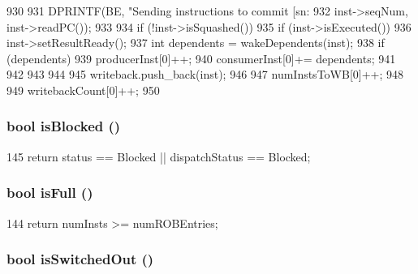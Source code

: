 \begin{DoxyCode}
930 {
931     DPRINTF(BE, "Sending instructions to commit [sn:%
932             inst->seqNum, inst->readPC());
933 
934     if (!inst->isSquashed()) {
935         if (inst->isExecuted()) {
936             inst->setResultReady();
937             int dependents = wakeDependents(inst);
938             if (dependents) {
939                 producerInst[0]++;
940                 consumerInst[0]+= dependents;
941             }
942         }
943     }
944 
945     writeback.push_back(inst);
946 
947     numInstsToWB[0]++;
948 
949     writebackCount[0]++;
950 }
\end{DoxyCode}
\hypertarget{classLWBackEnd_ae6ec007d68382eb124ed25bc90ae9c17}{
\subsubsection[{isBlocked}]{\setlength{\rightskip}{0pt plus 5cm}bool isBlocked ()}}
\label{classLWBackEnd_ae6ec007d68382eb124ed25bc90ae9c17}



\begin{DoxyCode}
145 { return status == Blocked || dispatchStatus == Blocked; }
\end{DoxyCode}
\hypertarget{classLWBackEnd_a3e70330939fdfc4dbc2f60c1a660584d}{
\subsubsection[{isFull}]{\setlength{\rightskip}{0pt plus 5cm}bool isFull ()}}
\label{classLWBackEnd_a3e70330939fdfc4dbc2f60c1a660584d}



\begin{DoxyCode}
144 { return numInsts >= numROBEntries; }
\end{DoxyCode}
\hypertarget{classLWBackEnd_a471165257f311a78136ce991a3bad31a}{
\subsubsection[{isSwitchedOut}]{\setlength{\rightskip}{0pt plus 5cm}bool isSwitchedOut ()}}
\label{classLWBackEnd_a471165257f311a78136ce991a3bad31a}



